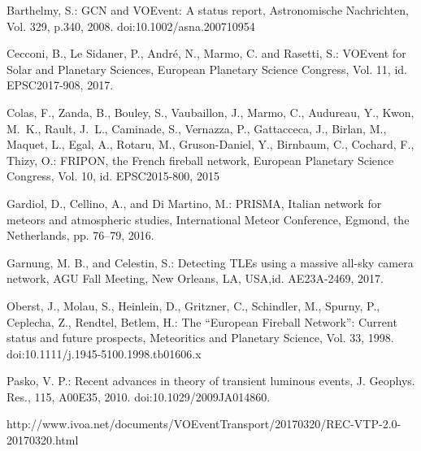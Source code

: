 \documentclass[10pt,twocolumn]{article}
\begin{document}
\begin{thebibliography}{}

\small

Barthelmy, S.: GCN and VOEvent: A status report, Astronomische Nachrichten, Vol. 329, p.340, 2008.
doi:10.1002/asna.200710954

Cecconi, B., Le Sidaner, P., Andr\'e, N., Marmo, C. and Rasetti, S.: VOEvent for Solar and Planetary Sciences, European Planetary Science Congress, Vol. 11, id. EPSC2017-908, 2017.

Colas, F., Zanda, B., Bouley, S., Vaubaillon, J., Marmo, C., Audureau, Y., Kwon, M.~K., Rault, J.~L., Caminade, S., Vernazza, P., Gattacceca, J., Birlan, M., Maquet, L., Egal, A., Rotaru, M., Gruson-Daniel, Y., Birnbaum, C., Cochard, F., Thizy, O.: FRIPON, the French fireball network, European Planetary Science Congress, Vol. 10, id. EPSC2015-800, 2015


Gardiol, D., Cellino, A., and Di Martino, M.: PRISMA, Italian network for meteors and atmospheric studies, International Meteor Conference, Egmond, the  Netherlands, pp. 76–79, 2016.

Garnung, M. B., and Celestin, S.: Detecting TLEs using a massive all-sky camera network, AGU Fall Meeting, New Orleans, LA, USA,id. AE23A-2469, 2017.

Oberst, J., Molau, S., Heinlein, D., Gritzner, C., Schindler, M., Spurny, P., Ceplecha, Z., Rendtel, Betlem, H.: The ``European Fireball Network'': Current status and future prospects, Meteoritics and Planetary Science, Vol. 33, 1998. doi:10.1111/j.1945-5100.1998.tb01606.x

Pasko, V. P.: Recent advances in theory of transient luminous events, J. Geophys. Res., 115, A00E35, 2010. doi:10.1029/2009JA014860.

http://www.ivoa.net/documents/VOEventTransport/20170320/REC-VTP-2.0-20170320.html
\end{thebibliography}
\end{document}
